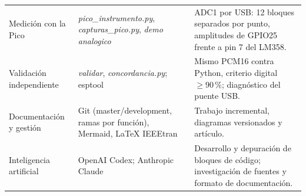 \documentclass[10pt,a4paper]{article}
\begin{document}
\begin{tabularx}{\linewidth}{@{}>{\raggedright\arraybackslash}p{3.2cm}>{\raggedright\arraybackslash}p{3.6cm}>{\raggedright\arraybackslash}X@{}}
Medición con la Pico & \emph{pico\_instrumento.py}, \emph{capturas\_pico.py}, \emph{demo analogico} & ADC1 por USB: 12 bloques separados por punto, amplitudes de GPIO25 frente a pin 7 del LM358. \\
Validación independiente & \emph{validar}, \emph{concordancia.py}; esptool & Mismo PCM16 contra Python, criterio digital $\geq90$\,\%; diagnóstico del puente USB. \\
Documentación y gestión & Git (master/development, ramas por función), Mermaid, \LaTeX{} IEEEtran & Trabajo incremental, diagramas versionados y artículo. \\
Inteligencia artificial & OpenAI Codex; Anthropic Claude & Desarrollo y depuración de bloques de código; investigación de fuentes y formato de documentación. \\
\bottomrule
\end{tabularx}
\normalsize
\end{document}
